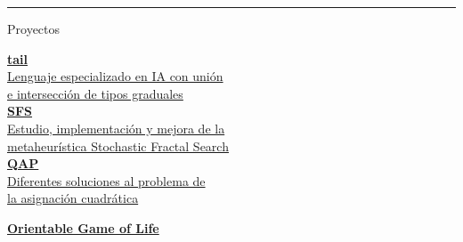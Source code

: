 \documentclass[12pt, letterpaper]{article}
\renewcommand{\small}{\fontsize{12}{14}\selectfont}
\begin{document}
	\vspace*{0.2cm}
	\begin{tcolorbox}[colback=box-color, sharp corners=all, width=\paperwidth, height=7.2cm, boxrule=0pt, colframe=box-color]
		{\bigskip \color{base-color} \hspace*{-1cm} \rule{1.2\textwidth}{0.1cm}}
		{\vspace*{-1.15cm}
		 \centering
		 \begin{tcolorbox}[left=1mm, right=1mm, top=1mm, bottom=1mm, colback=base-color, boxrule=0pt, colframe=base-color, width=2.6cm]
			\textcolor{text2-color}{\large Proyectos}
		 \end{tcolorbox}}
	 	\bigskip
	 	
	 	\color{text-color}
	 	\hspace*{0.1cm}
	 	\begin{minipage}[t]{0.57\textwidth}
	 		\vspace*{-1.1cm}
	 		\href{https://github.com/bruno-sm/tail}{
	 		\textcolor{highlight-color}{\textbf{tail}} \smallskip\\
	 		\hspace*{0.1cm} \small Lenguaje especializado en IA con unión\\ \hspace*{0.1cm} e intersección de tipos graduales} \medskip\\
	 		\href{https://github.com/bruno-sm/SFS}{
	 		\textcolor{highlight-color}{\textbf{SFS}} \smallskip\\
	 		\hspace*{0.1cm} \small Estudio, implementación y mejora de la\\ \hspace*{0.1cm} metaheurística Stochastic Fractal Search} \medskip\\
 			\href{https://github.com/bruno-sm/QAP}{
	 		\textcolor{highlight-color}{\textbf{QAP}} \smallskip\\
	 		\hspace*{0.1cm} \small Diferentes soluciones al problema de\\
\hspace*{0.1cm} la asignación cuadrática}\\
	 	\end{minipage}
	 	\begin{minipage}[t]{0.43\textwidth}
	 		\vspace*{0.01cm}
	 		\href{https://github.com/bruno-sm/OrientableGameOfLife}{
	 		\textcolor{highlight-color}{\textbf{Orientable Game of Life}} \smallskip\\
}
\end{minipage}
\end{tcolorbox}
\end{document}
